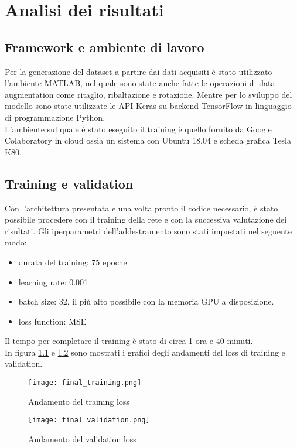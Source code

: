 \chapter{Analisi dei risultati}

\section{Framework e ambiente di lavoro}
Per la generazione del dataset a partire dai dati acquisiti è stato utilizzato l'ambiente MATLAB, nel quale sono state anche fatte le operazioni di data augmentation come ritaglio, ribaltazione e rotazione. Mentre per lo sviluppo del modello sono state utilizzate le API Keras su backend TensorFlow in linguaggio di programmazione Python.\\
L'ambiente sul quale è stato eseguito il training è quello fornito da Google Colaboratory in cloud ossia un sistema con Ubuntu 18.04 e scheda grafica Tesla K80.

\section{Training e validation}
Con l'architettura presentata e una volta pronto il codice necessario, è stato possibile procedere con il training della rete e con la successiva valutazione dei risultati.
Gli iperparametri dell'addestramento sono stati impostati nel seguente modo:
\begin{itemize}
    \item durata del training: 75 epoche
    \item learning rate: 0.001
    \item batch size: 32, il più alto possibile con la memoria GPU a disposizione.
    \item loss function: MSE
\end{itemize}
Il tempo per completare il training è stato di circa 1 ora e 40 minuti.\\
In figura \ref{training} e \ref{validation} sono mostrati i grafici degli andamenti del loss di training e validation.
\begin{figure}[H]
    \centering
    \texttt{[image: final\_training.png]}
    \caption[Andamento del training loss]{Andamento del training loss}
    \label{training}
\end{figure}

\begin{figure}[H]
    \centering
    \texttt{[image: final\_validation.png]}
    \caption[Andamento del validation loss]{Andamento del validation loss}
    \label{validation}
\end{figure}

